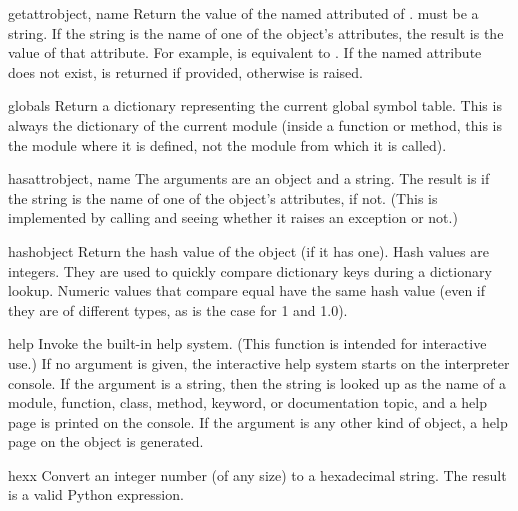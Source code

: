 \begin{funcdesc}{getattr}{object, name}
  Return the value of the named attributed of .  
  must be a string.  If the string is the name of one of the object's
  attributes, the result is the value of that attribute.  For example,
   is equivalent to .  If the
  named attribute does not exist,  is returned if provided,
  otherwise  is raised.
\end{funcdesc}

\begin{funcdesc}{globals}{}
  Return a dictionary representing the current global symbol table.
  This is always the dictionary of the current module (inside a
  function or method, this is the module where it is defined, not the
  module from which it is called).
\end{funcdesc}

\begin{funcdesc}{hasattr}{object, name}
  The arguments are an object and a string.  The result is  if the
  string is the name of one of the object's attributes,  if not.
  (This is implemented by calling  and seeing whether it raises an exception or not.)
\end{funcdesc}

\begin{funcdesc}{hash}{object}
  Return the hash value of the object (if it has one).  Hash values
  are integers.  They are used to quickly compare dictionary
  keys during a dictionary lookup.  Numeric values that compare equal
  have the same hash value (even if they are of different types, as is
  the case for 1 and 1.0).
\end{funcdesc}

\begin{funcdesc}{help}{}
  Invoke the built-in help system.  (This function is intended for
  interactive use.)  If no argument is given, the interactive help
  system starts on the interpreter console.  If the argument is a
  string, then the string is looked up as the name of a module,
  function, class, method, keyword, or documentation topic, and a
  help page is printed on the console.  If the argument is any other
  kind of object, a help page on the object is generated.
\end{funcdesc}

\begin{funcdesc}{hex}{x}
  Convert an integer number (of any size) to a hexadecimal string.
  The result is a valid Python expression.
\end{funcdesc}

